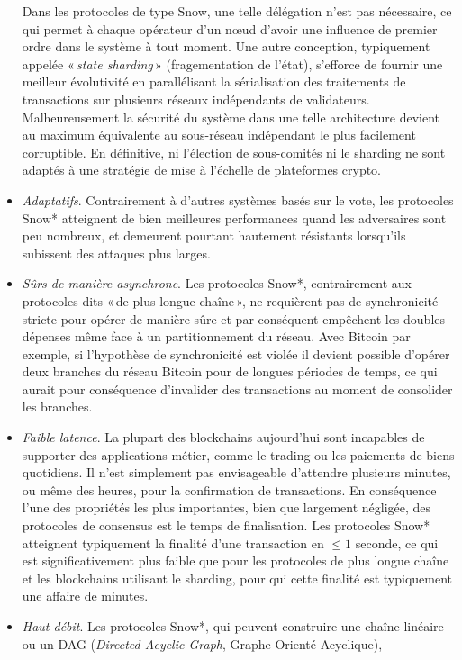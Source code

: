 \documentclass[runningheads,francais,a4paper]{llncs}
\begin{document}
\begin{itemize}
Dans les protocoles de type Snow, une telle délégation n'est pas nécessaire, ce qui permet à chaque opérateur d'un nœud
d'avoir une influence de premier ordre dans le système à tout moment. Une autre conception, typiquement appelée
«\,\emph{state sharding}\,» (fragementation de l'état), s'efforce de fournir une meilleur évolutivité en parallélisant la sérialisation des traitements de transactions
sur plusieurs réseaux indépendants de validateurs. Malheureusement la sécurité du système dans une telle architecture
devient au maximum équivalente au sous-réseau indépendant le plus facilement corruptible. En définitive, ni l'élection
de sous-comités ni le sharding ne sont adaptés à une stratégie de mise à l'échelle de plateformes crypto.
\item \textit{Adaptatifs}. Contrairement à d'autres systèmes basés sur le vote, les protocoles Snow* atteignent de bien
meilleures performances quand les adversaires sont peu nombreux, et demeurent pourtant hautement résistants lorsqu'ils
subissent des attaques plus larges.
\item \textit{Sûrs de manière asynchrone}. Les protocoles Snow*, contrairement aux protocoles dits «\,de plus longue
chaîne\,», ne requièrent pas de synchronicité stricte pour opérer de manière sûre et par conséquent empêchent les doubles
dépenses même face à un partitionnement du réseau. Avec Bitcoin par exemple, si l'hypothèse de synchronicité est violée
il devient possible d'opérer deux branches du réseau Bitcoin pour de longues périodes de temps, ce qui aurait pour
conséquence d'invalider des transactions au moment de consolider les branches.
\item \textit{Faible latence}. La plupart des blockchains aujourd'hui sont incapables de supporter des applications
métier, comme le trading ou les paiements de biens quotidiens. Il n'est simplement pas envisageable d'attendre plusieurs
minutes, ou même des heures, pour la confirmation de transactions. En conséquence l'une des propriétés les plus importantes,
bien que largement négligée, des protocoles de consensus est le temps de finalisation. Les protocoles Snow* atteignent
typiquement la finalité d'une transaction en $\leq 1$ seconde, ce qui est significativement plus faible que pour les
protocoles de plus longue chaîne et les blockchains utilisant le sharding, pour qui cette finalité est typiquement une
affaire de minutes.
\item \textit{Haut débit}. Les protocoles Snow*, qui peuvent construire une chaîne linéaire ou un DAG (\emph{Directed Acyclic Graph}, Graphe Orienté Acyclique),

\end{itemize}
\end{document}
